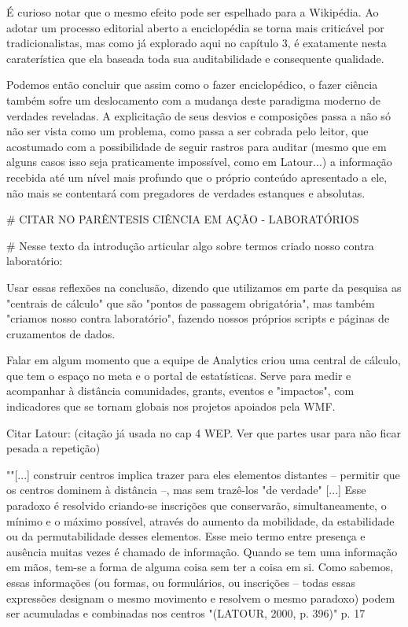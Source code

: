 É curioso notar que o mesmo efeito pode ser espelhado para a Wikipédia. Ao adotar um processo editorial aberto a enciclopédia se torna mais criticável por tradicionalistas, mas como já explorado aqui no capítulo 3, é exatamente nesta caraterística que ela baseada toda sua auditabilidade e consequente qualidade.

Podemos então concluir que assim como o fazer enciclopédico, o fazer ciência também sofre um deslocamento com a mudança deste paradigma moderno de verdades reveladas. A explicitação de seus desvios e composições passa a não só não ser vista como um problema, como passa a ser cobrada pelo leitor, que acostumado com a possibilidade de seguir rastros para auditar (mesmo que em alguns casos isso seja praticamente impossível, como em Latour...) a informação recebida até um nível mais profundo que o próprio conteúdo apresentado a ele, não mais se contentará com pregadores de verdades estanques e absolutas.

# CITAR NO PARÊNTESIS CIÊNCIA EM AÇÃO - LABORATÓRIOS

# Nesse texto da introdução articular algo sobre termos criado nosso contra laboratório:

Usar essas reflexões na conclusão, dizendo que utilizamos em parte da pesquisa as "centrais de cálculo" que são "pontos de passagem obrigatória", mas também "criamos nosso contra laboratório", fazendo nossos próprios scripts e páginas de cruzamentos de dados.

Falar em algum momento que a equipe de Analytics criou uma central de cálculo, que tem o espaço no meta e o portal de estatísticas. Serve para medir e acompanhar à distância comunidades, grants, eventos e "impactos", com indicadores que se tornam globais nos projetos apoiados pela WMF.

Citar Latour: (citação já usada no cap 4 WEP. Ver que partes usar para não ficar pesada a repetição)

""[...] construir centros implica trazer para eles elementos distantes – permitir que os centros dominem à distância –, mas sem trazê-los "de verdade" [...] Esse paradoxo é resolvido criando-se inscrições que conservarão, simultaneamente, o mínimo e o máximo possível, através do aumento da mobilidade, da estabilidade ou da permutabilidade desses elementos. Esse meio termo entre presença e ausência muitas vezes é chamado de informação. Quando se tem uma informação em mãos, tem-se a forma de alguma coisa sem ter a coisa em si. Como sabemos, essas informações (ou formas, ou formulários, ou inscrições – todas essas expressões designam o mesmo movimento e resolvem o mesmo paradoxo) podem ser acumuladas e combinadas nos centros "(LATOUR, 2000, p. 396)" p. 17

